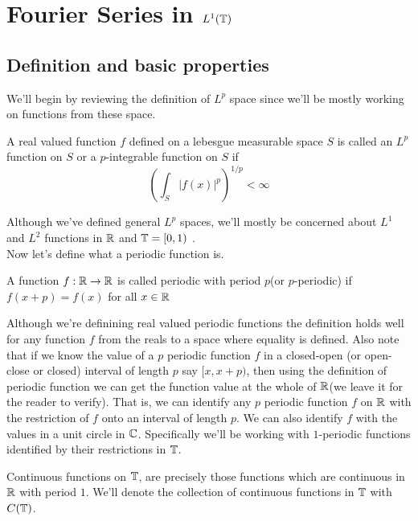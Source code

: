 \newpage
\section{Fourier Series in $L^1(\mathbb T)$}

  \subsection{Definition and basic properties}

    We'll begin by reviewing the definition of $L^p$ space since we'll be mostly working on functions from these space.
  \begin{definition}[$L^p$ function]
    \label{def:Lp_function}
    A real valued function $f$ defined on a lebesgue measurable space $S$ is called an $L^p$ function on $S$ or a $p$-integrable function on $S$ if 
    \begin{displaymath}
       \left( \int_{S} |f(x)|^p \right)^{1/p} < \infty
    \end{displaymath}
\end{definition}  
  Although we've defined general $L^p$ spaces, we'll mostly be concerned about $L^1$ and $L^2$ functions in $\mathbb R$ and $\mathbb T = [0, 1)$ .
  \\

  Now let's define what a periodic function is.
  \begin{definition}
    \label{def:periodic_function}
    A function $f:\mathbb R \to \mathbb R$ is called periodic with period $p$(or $p$-periodic) if $f(x+p) = f(x)$ for all $x \in \mathbb R$

  \end{definition}
  Although we're definining real valued periodic functions the definition holds well for any function $f$ from the reals to a space where equality is defined.
  Also note that if we know the value of a $p$ periodic function $f$ in a closed-open (or open-close or closed) interval of length $p$ say $[x, x+p)$, then using the definition of periodic function we can get the function value at the whole of $\mathbb R$(we leave it for the reader to verify). That is, we can identify any $p$ periodic function $f$ on $\mathbb R$ with the restriction of $f$ onto an interval of length $p$. We can also identify $f$ with the values in a unit circle in $\mathbb C$.
  Specifically we'll be working with $1$-periodic functions identified by their restrictions in $\mathbb T$.
\\

  \begin{definition}
    \label{def:continuous_functions_on_T}
    Continuous functions on $\mathbb T$, are precisely those functions which are continuous in $\mathbb R$ with period $1$. We'll denote the collection of continuous functions in $\mathbb T$ with $C(\mathbb T)$.
  \end{definition}

